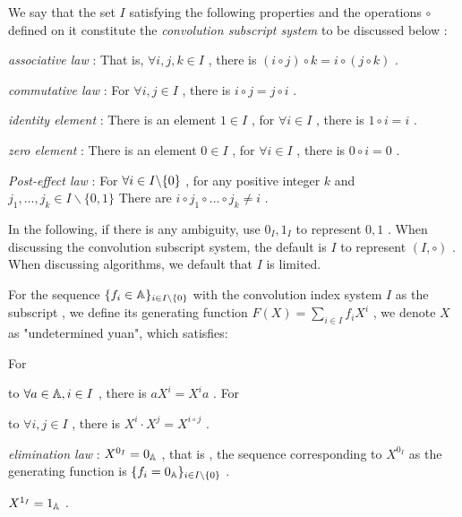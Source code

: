 \begin { definition } 
We say that the set $ I $ satisfying the following properties and the operations $ \circ $ defined on it constitute the \emph { convolution subscript system } to be discussed below :
\begin { itemize }
\item  \emph { associative law }: That is, $ \forall i,j,k \in I $ , there is $ (i \circ j) \circ k = i \circ (j \circ k) $ .
\item  \emph { commutative law }: For $ \forall i,j \in I $ , there is $ i \circ j = j \circ i $ .
\item  \emph { identity element }: There is an element $ 1  \in I $ , for $ \forall i \in I $ , there is $ 1 \circ i = i $ .
\item  \emph { zero element }: There is an element $ 0 \in I $ , for $ \forall i \in I $ , there is $ 0 \circ i = 0 $ .
\item  \emph { Post-effect law }: For $ \forall i \in  {I \backslash \{ 0 \} } $ , for any positive integer $ k $ and $ j_ 1 , \dots ,j_k \in I \backslash  \{ 0 , 1 \} $ There are $ i \circ j_ 1 \circ  \dots  \circ j_k \neq i $ .
\end { itemize }
In the following, if there is any ambiguity, use $ 0 _I, 1 _I $ to represent $ 0 , 1 $ . When discussing the convolution subscript system, the default is $ I $ to represent $ (I, \circ ) $ . When discussing algorithms, we default that $ I $ is limited.
\end { definition }

\begin { definition } 
For the sequence $ \{ f_i \in  \mathbb A\} _{i \in {I \backslash \{ 0 \} } } $ with the convolution index system $ I $ as the subscript , we define its generating function $ F(X) = \sum _{i \in I} f_i X^i $ , we denote $ X $ as "undetermined yuan", which satisfies:  

\begin { itemize }
For \item to $ \forall a \in   \mathbb A , i \in I $ , there is $ aX^i = X^ia $ .
For \item to $ \forall i,j \in I $ , there is $ X^i \cdot X^j = X^{i \circ j} $ .
\item  \emph { elimination law }: $ X^{0_I} = 0 _{  \mathbb A } $ , that is , the sequence corresponding to $ X^{0_I} $ as the generating function is $ \{ f_i = 0 _{  \mathbb A } \} _{i \in  {I \backslash \{ 0 \} } } $ .
\item  $ X^{1_I} = 1 _{  \mathbb A } $ .
\end { itemize }

\end { definition }

